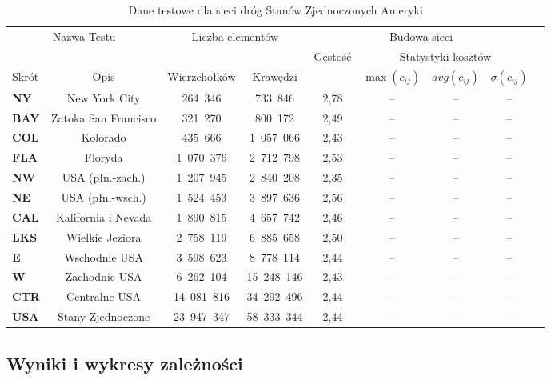\begin{table}[h]
\centering
\begin{tabular}{lcccccccc}
\hline
\multicolumn{2}{c|}{\multirow{2}{*}{Nazwa Testu}} & \multicolumn{2}{c|}{\multirow{2}{*}{Liczba elementów}} & \multicolumn{4}{c}{Budowa sieci} &  \\ \cline{5-9}
\multicolumn{2}{l|}{} & \multicolumn{2}{c|}{} & \multirow{2}{*}{Gęstość} & \multicolumn{3}{|c}{Statystyki kosztów} &  \\ \cline{1-4} \cline{6-9}
\multicolumn{1}{l|}{Skrót} & \multicolumn{1}{c|}{Opis} & \multicolumn{1}{c|}{Wierzchołków} & \multicolumn{1}{c|}{Krawędzi} & & \multicolumn{1}{|c}{$\max \left( c_{ij} \right) $} & \multicolumn{1}{|c}{$ avg \left( c_{ij} \right) $} & \multicolumn{1}{|c}{$\sigma \left( c_{ij} \right) $} &  \\
\hline
\textbf{NY} & New York City &  264~346 &  733~846 & 2,78 & -- & -- & -- &  \\
\textbf{BAY} & Zatoka San Francisco &  321~270 &  800~172 & 2,49 & -- & -- & -- &  \\
\textbf{COL} & Kolorado &  435~666 &  1~057~066 & 2,43 & -- & -- & -- &  \\
\textbf{FLA} & Floryda &  1~070~376 &  2~712~798 & 2,53 & -- & -- & -- &  \\
\textbf{NW} & USA (płn.-zach.) & 1~207~945 & 2~840~208 & 2,35 & -- & -- & -- &  \\
\textbf{NE} & USA (płn.-wsch.) & 1~524~453 & 3~897~636 & 2,56 & -- & -- & -- &  \\
\textbf{CAL} & Kalifornia i Nevada & 1~890~815 & 4~657~742 & 2,46 & -- & -- & -- &  \\
\textbf{LKS} & Wielkie Jeziora & 2~758~119 & 6~885~658 & 2,50 & -- & -- & -- &  \\
\textbf{E} & Wschodnie USA & 3~598~623 & 8~778~114 & 2,44 & -- & -- & -- &  \\
\textbf{W} & Zachodnie USA & 6~262~104 & 15~248~146 & 2,43 & -- & -- & -- &  \\
\textbf{CTR} & Centralne USA & 14~081~816 & 34~292~496 & 2,44 & -- & -- & -- &  \\
\textbf{USA} & Stany Zjednoczone & 23~947~347 & 58~333~344 & 2,44 & -- & -- & -- &  \\
\hline
\end{tabular}
\caption{Dane testowe dla sieci dróg Stanów Zjednoczonych Ameryki}
\label{tab:USARoad}
\end{table}

\subsection{Wyniki i wykresy zależności}

